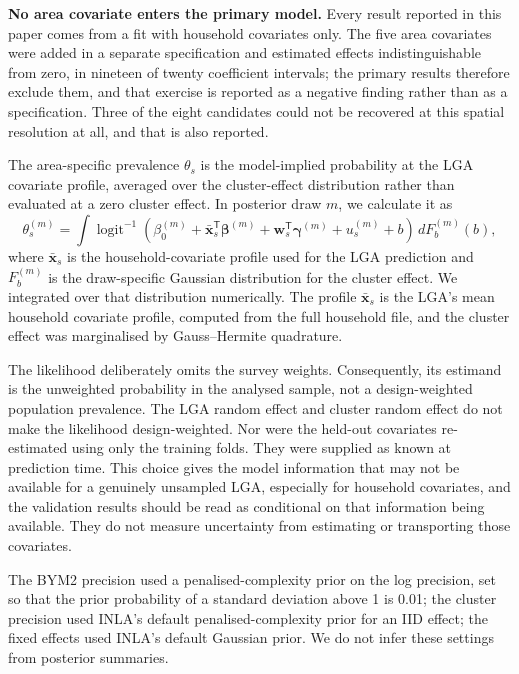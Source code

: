 \textbf{No area covariate enters the primary model.} Every result reported in this paper comes from a fit with household covariates only. The five area covariates were added in a separate specification and estimated effects indistinguishable from zero, in nineteen of twenty coefficient intervals; the primary results therefore exclude them, and that exercise is reported as a negative finding rather than as a specification. Three of the eight candidates could not be recovered at this spatial resolution at all, and that is also reported.

The area-specific prevalence \(\theta_s\) is the model-implied probability at the LGA covariate profile, averaged over the cluster-effect distribution rather than evaluated at a zero cluster effect. In posterior draw \(m\), we calculate it as
\[
  \theta_s^{(m)}
  = \int \operatorname{logit}^{-1}\!\left(
       \beta_0^{(m)}
       + \bar{\mathbf{x}}_s^\mathsf{T}\boldsymbol{\beta}^{(m)}
       + \mathbf{w}_s^\mathsf{T}\boldsymbol{\gamma}^{(m)}
       + u_s^{(m)} + b
    \right)\,dF_b^{(m)}(b),
\]
where \(\bar{\mathbf{x}}_s\) is the household-covariate profile used for the LGA prediction and \(F_b^{(m)}\) is the draw-specific Gaussian distribution for the cluster effect. We integrated over that distribution numerically. The profile \(\bar{\mathbf{x}}_s\) is the LGA's mean household covariate profile, computed from the full household file, and the cluster effect was marginalised by Gauss--Hermite quadrature.

The likelihood deliberately omits the survey weights. Consequently, its estimand is the unweighted probability in the analysed sample, not a design-weighted population prevalence. The LGA random effect and cluster random effect do not make the likelihood design-weighted. Nor were the held-out covariates re-estimated using only the training folds. They were supplied as known at prediction time. This choice gives the model information that may not be available for a genuinely unsampled LGA, especially for household covariates, and the validation results should be read as conditional on that information being available. They do not measure uncertainty from estimating or transporting those covariates.

The BYM2 precision used a penalised-complexity prior on the log precision, set so that the prior probability of a standard deviation above 1 is 0.01; the cluster precision used INLA's default penalised-complexity prior for an IID effect; the fixed effects used INLA's default Gaussian prior. We do not infer these settings from posterior summaries.

